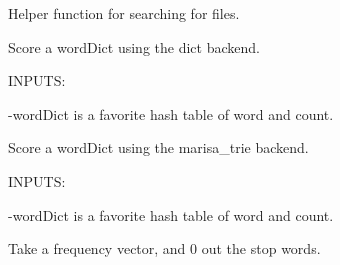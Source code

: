 \begin{fulllineitems}
\begin{fulllineitems}
\end{fulllineitems}


\begin{fulllineitems}
\label{labMTsimple:labMTsimple.speedy.sentiDict.openWithPath}
Helper function for searching for files.

\end{fulllineitems}


\begin{fulllineitems}
\label{labMTsimple:labMTsimple.speedy.sentiDict.scoreTrieDict}
Score a wordDict using the dict backend.

INPUTS:

-wordDict is a favorite hash table of word and count.

\end{fulllineitems}


\begin{fulllineitems}
\label{labMTsimple:labMTsimple.speedy.sentiDict.scoreTrieMarisa}
Score a wordDict using the marisa\_trie backend.

INPUTS:

-wordDict is a favorite hash table of word and count.

\end{fulllineitems}


\begin{fulllineitems}
\label{labMTsimple:labMTsimple.speedy.sentiDict.stopData}
\end{fulllineitems}


\begin{fulllineitems}
\label{labMTsimple:labMTsimple.speedy.sentiDict.stopper}
Take a frequency vector, and 0 out the stop words.


\end{fulllineitems}
\end{fulllineitems}
